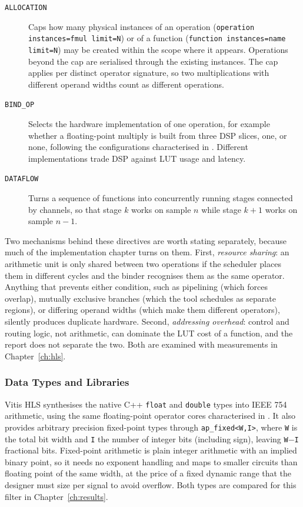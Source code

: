 \documentclass[12pt,a4paper]{article}
\begin{document}
\begin{description}
  \item[\texttt{ALLOCATION}] Caps how many physical instances of an
        operation (\texttt{operation instances=fmul limit=N}) or of
        a function (\texttt{function instances=name limit=N}) may be
        created within the scope where it appears. Operations beyond
        the cap are serialised through the existing instances. The
        cap applies per distinct operator signature, so two
        multiplications with different operand widths count as
        different operations.
  \item[\texttt{BIND\_OP}] Selects the hardware implementation of
        one operation, for example whether a floating-point multiply
        is built from three DSP slices, one, or none, following the
        configurations characterised in
        \citep{amd_pg060_floating_point}. Different implementations
        trade DSP against LUT usage and latency.
  \item[\texttt{DATAFLOW}] Turns a sequence of functions into
        concurrently running stages connected by channels, so that
        stage $k$ works on sample $n$ while stage $k{+}1$ works on
        sample $n{-}1$.
\end{description}

Two mechanisms behind these directives are worth stating
separately, because much of the implementation chapter turns on
them. First, \emph{resource sharing}: an arithmetic unit is only
shared between two operations if the scheduler places them in
different cycles and the binder recognises them as the same
operator. Anything that prevents either condition, such as
pipelining (which forces overlap), mutually exclusive branches
(which the tool schedules as separate regions), or differing
operand widths (which make them different operators), silently
produces duplicate hardware. Second, \emph{addressing overhead}:
control and routing logic, not arithmetic, can dominate the LUT
cost of a function, and the report does not separate the two.
Both are examined with measurements in
Chapter~\ref{ch:hls}.

\subsubsection{Data Types and Libraries}
\label{sec:hls-types}

Vitis HLS synthesises the native C++ \texttt{float} and
\texttt{double} types into IEEE 754 arithmetic, using the same
floating-point operator cores characterised in
\citep{amd_pg060_floating_point}. It also provides arbitrary
precision fixed-point types through \texttt{ap\_fixed<W,I>}, where
\texttt{W} is the total bit width and \texttt{I} the number of
integer bits (including sign), leaving \texttt{W}$-$\texttt{I}
fractional bits. Fixed-point arithmetic is plain integer arithmetic
with an implied binary point, so it needs no exponent handling and
maps to smaller circuits than floating point of the same width, at
the price of a fixed dynamic range that the designer must size per
signal to avoid overflow. Both types are compared for this filter in
Chapter~\ref{ch:results}.
\end{document}

